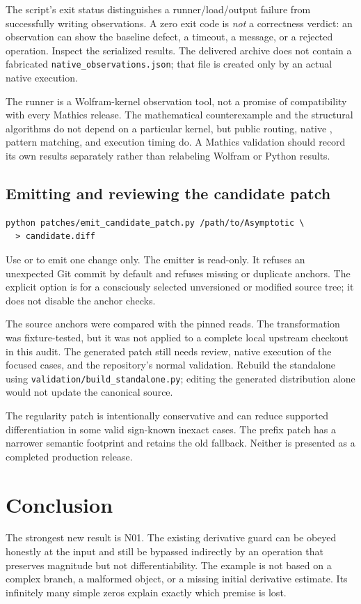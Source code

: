 \documentclass[11pt,a4paper]{article}
\newcommand{\code}[1]{\texttt{\detokenize{#1}}}
\newcommand{\file}[1]{\nolinkurl{#1}}
\begin{document}
The script's exit status distinguishes a runner/load/output failure from
successfully writing observations. A zero exit code is \emph{not} a correctness
verdict: an observation can show the baseline defect, a timeout, a message, or a
rejected operation. Inspect the serialized results. The delivered archive does
not contain a fabricated \file{native_observations.json}; that file is created
only by an actual native execution.

The runner is a Wolfram-kernel observation tool, not a promise of compatibility
with every Mathics release. The mathematical counterexample and the structural
algorithms do not depend on a particular kernel, but public routing, native
\code{Series}, pattern matching, and execution timing do. A Mathics validation
should record its own results separately rather than relabeling Wolfram or
Python results.

\subsection{Emitting and reviewing the candidate patch}
\begin{lstlisting}
python patches/emit_candidate_patch.py /path/to/Asymptotic \
  > candidate.diff
\end{lstlisting}
Use \code{--which regularity} or \code{--which prefix} to emit one change only.
The emitter is read-only. It refuses an unexpected Git commit by default and
refuses missing or duplicate anchors. The explicit
\code{--skip-commit-check} option is for a consciously selected unversioned or
modified source tree; it does not disable the anchor checks.

The source anchors were compared with the pinned reads. The transformation was
fixture-tested, but it was not applied to a complete local upstream checkout in
this audit. The generated patch still needs review, native execution of the
focused cases, and the repository's normal validation. Rebuild the standalone
using \file{validation/build_standalone.py}; editing the generated distribution
alone would not update the canonical source.\cite{layout}

The regularity patch is intentionally conservative and can reduce supported
differentiation in some valid sign-known inexact cases. The prefix patch has a
narrower semantic footprint and retains the old fallback. Neither is presented
as a completed production release.

\section{Conclusion}
The strongest new result is N01. The existing derivative guard can be obeyed
honestly at the input and still be bypassed indirectly by an operation that
preserves magnitude but not differentiability. The example is not based on a
complex branch, a malformed object, or a missing initial derivative estimate.
Its infinitely many simple zeros explain exactly which premise is lost.
\end{document}
